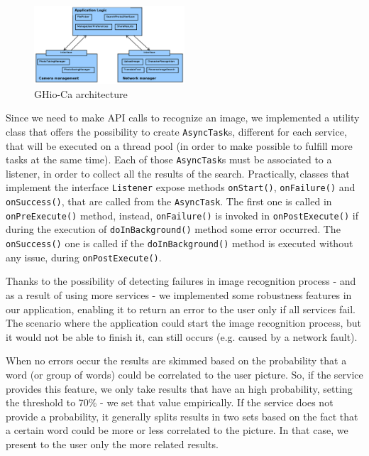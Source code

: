 \begin{figure}[h]
    \centering
    \includegraphics[width=0.50\textwidth]{../img/ghioca_macro_component}
    \caption{GHio-Ca architecture}
    \label{fig:architecture}
\end{figure}

Since we need to make API calls to recognize an image, we implemented a
utility class that offers the possibility to create \texttt{AsyncTask}s,
different for each service, that will be executed on a thread pool (in order to
make possible to fulfill more tasks at the same time). Each of those
\texttt{AsyncTask}s must be associated to a listener, in order to collect all
the results of the search. Practically, classes that implement the interface
\texttt{Listener} expose methods \texttt{onStart()}, \texttt{onFailure()} and
\texttt{onSuccess()}, that are called from the \texttt{AsyncTask}. The first one
is called in \texttt{onPreExecute()} method, instead, \texttt{onFailure()} is 
invoked in \texttt{onPostExecute()} if during the execution of \texttt{doInBackground()} 
method some error occurred. The \texttt{onSuccess()} one is called if the 
\texttt{doInBackground()} method is executed without any issue, during 
\texttt{onPostExecute()}.

Thanks to the possibility of detecting failures in image recognition process - 
and as a result of using more services - we implemented some robustness features 
in our application, enabling it to return an error to the user only if all 
services fail. The scenario where the application could start the image 
recognition process, but it would not be able to finish it, can still occurs 
(e.g. caused by a network fault).

When no errors occur the results are skimmed based on the probability that a
word (or group of words) could be correlated to the user picture. So, if the
service provides this feature, we only take results that have an high
probability, setting the threshold to 70\% - we set that value empirically. If 
the service does not provide a probability, it generally splits results in two 
sets based on the fact that a certain word could be more or less correlated to 
the picture. In that case, we present to the user only the more related results.

